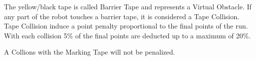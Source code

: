 The yellow/black tape is called Barrier Tape and represents a Virtual Obstacle. If any part of the robot
touches a barrier tape, it is considered a Tape Collision. Tape Collision induce a point penalty
proportional to the final points of the run. With each collision 5\% of the final points are deducted up to a maximum
of 20\%. 

A Collions with the Marking Tape will not be penalized.


